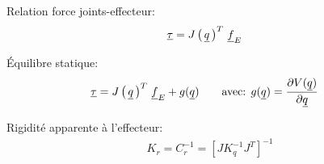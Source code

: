Relation force joints-effecteur:
\begin{align}
\underline{\tau} &= J\left( \, \underline{q} \, \right)^T \, \underline{f}_E 
\end{align}

Équilibre statique:
\begin{align}
\underline{\tau} &= J\left( \, \underline{q} \, \right)^T \, \underline{f}_E +  g( \underline{q} )
\quad \quad \text{avec:  }
g( \underline{q} ) = 
\frac{ \partial V(\underline{q} ) }{\partial \underline{q} } 
\end{align}

Rigidité apparente à l'effecteur:
\begin{align}
K_r = C_r^{-1} = \left[ J K_q^{-1} J^T \right]^{-1}
\end{align}
